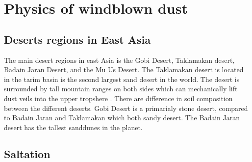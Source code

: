 

\section{Physics of windblown dust}

\subsection{Deserts regions in East Asia}
The main desert regions in east Asia is the Gobi Desert, Taklamakan desert, Badain Jaran Desert,  and the Mu Us Desert. The Taklamakan desert is located in the tarim basin is the second largest sand desert in the world. The desert is surrounded by tall mountain ranges on both sides which can mechanically lift dust veils into the upper tropshere \parencite{yumimoto_elevated_2009}.   There are difference in soil composition between the different deserts. Gobi Desert is a primarialy stone desert, compared to Badain Jaran and Taklamakan which both sandy desert. The Badain Jaran desert has the tallest sanddunes in the planet. 
\subsection{Saltation}